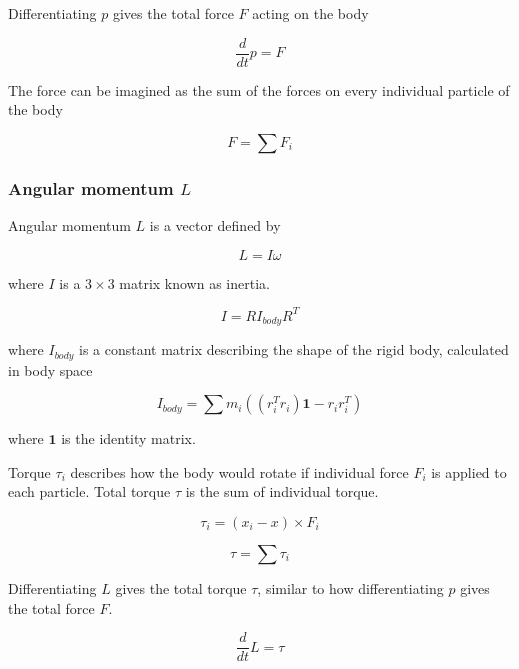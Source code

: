\documentclass[runningheads]{llncs}
\begin{document}
Differentiating $p$ gives the total force $F$ acting on the body

\begin{equation}
\frac{d}{dt} p = F
\end{equation}

The force can be imagined as the sum of the forces on every individual particle of the body

\begin{equation}
F = \sum F_i
\end{equation}

\subsubsection{Angular momentum $L$} 

Angular momentum $L$ is a vector defined by

\begin{equation}
L = I \omega
\end{equation}

where $I$ is a $3\times 3$ matrix known as inertia.

\begin{equation}
I = R I_{body} R^T
\end{equation}

where $I_{body}$ is a constant matrix describing the shape of the rigid body, calculated in body space
    
\begin{equation}
I_{body} = \sum m_i((r_i^T r_i)\textbf{1} - r_i r_i^T)
\end{equation}

where $\textbf{1}$ is the identity matrix.

Torque $\tau_i$ describes how the body would rotate if individual force $F_i$ is applied to each particle. Total torque $\tau$ is the sum of individual torque.

\begin{equation}
\tau_i = (x_i - x) \times F_i
\end{equation}

\begin{equation}
\tau = \sum \tau_i
\end{equation}

Differentiating $L$ gives the total torque $\tau$, similar to how differentiating $p$ gives the total force $F$.

\begin{equation}
\frac{d}{dt} L = \tau
\end{equation}
\end{document}

